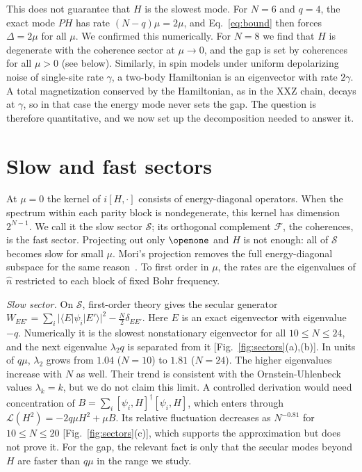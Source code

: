 \documentclass[aps,pre,twocolumn,superscriptaddress,amsmath,amssymb,10pt]{revtex4-2}
\newcommand{\Lc}{\mathcal{L}}
\begin{document}
This does not guarantee that $H$ is the slowest mode. For $N=6$ and $q=4$, the exact mode $PH$ has rate $(N-q)\mu=2\mu$, and Eq.~\eqref{eq:bound} then forces $\Delta=2\mu$ for all $\mu$. We confirmed this numerically. For $N=8$ we find that $H$ is degenerate with the coherence sector at $\mu\to0$, and the gap is set by coherences for all $\mu>0$ (see below). Similarly, in spin models under uniform depolarizing noise of single-site rate $\gamma$, a two-body Hamiltonian is an eigenvector with rate $2\gamma$. A total magnetization conserved by the Hamiltonian, as in the XXZ chain, decays at $\gamma$, so in that case the energy mode never sets the gap. The question is therefore quantitative, and we now set up the decomposition needed to answer it.

\section{Slow and fast sectors}

At $\mu=0$ the kernel of $i[H,\cdot]$ consists of energy-diagonal operators. When the spectrum within each parity block is nondegenerate, this kernel has dimension $2^{N-1}$. We call it the slow sector $\mathcal S$; its orthogonal complement $\mathcal F$, the coherences, is the fast sector. Projecting out only $\openone$ and $H$ is not enough: all of $\mathcal S$ becomes slow for small $\mu$. Mori's projection removes the full energy-diagonal subspace for the same reason~\cite{Mori2024}. To first order in $\mu$, the rates are the eigenvalues of $\hat n$ restricted to each block of fixed Bohr frequency.

\emph{Slow sector.} On $\mathcal S$, first-order theory gives the secular generator $W_{EE'}=\sum_i|\langle E|\psi_i|E'\rangle|^2-\tfrac N2\delta_{EE'}$. Here $E$ is an exact eigenvector with eigenvalue $-q$. Numerically it is the slowest nonstationary eigenvector for all $10\le N\le24$, and the next eigenvalue $\lambda_2 q$ is separated from it [Fig.~\ref{fig:sectors}(a),(b)]. In units of $q\mu$, $\lambda_2$ grows from $1.04$ ($N=10$) to $1.81$ ($N=24$). The higher eigenvalues increase with $N$ as well. Their trend is consistent with the Ornstein-Uhlenbeck values $\lambda_k=k$, but we do not claim this limit. A controlled derivation would need concentration of $B=\sum_i[\psi_i,H]^\dagger[\psi_i,H]$, which enters through $\Lc(H^2)=-2q\mu H^2+\mu B$. Its relative fluctuation decreases as $N^{-0.81}$ for $10\le N\le20$ [Fig.~\ref{fig:sectors}(c)], which supports the approximation but does not prove it. For the gap, the relevant fact is only that the secular modes beyond $H$ are faster than $q\mu$ in the range we study.
\end{document}
